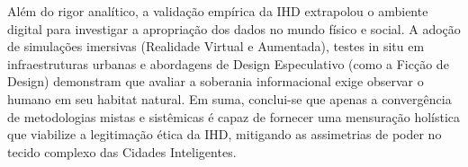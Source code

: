 \documentclass[
	12pt,				%
	oneside,			%
	a4paper,			%
	english,			%
	brazil				%
	]{abntex2ppgsi}
\begin{document}
    Além do rigor analítico, a validação empírica da IHD extrapolou o ambiente digital para investigar a apropriação dos dados no mundo físico e social. A adoção de simulações imersivas (Realidade Virtual e Aumentada), testes in situ em infraestruturas urbanas e abordagens de Design Especulativo (como a Ficção de Design) demonstram que avaliar a soberania informacional exige observar o humano em seu habitat natural. Em suma, conclui-se que apenas a convergência de metodologias mistas e sistêmicas é capaz de fornecer uma mensuração holística que viabilize a legitimação ética da IHD, mitigando as assimetrias de poder no tecido complexo das Cidades Inteligentes.

    
    
\end{document}
